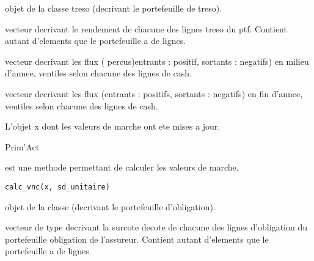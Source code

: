 \documentclass[a4paper]{book}
\begin{document}
\begin{Arguments}
\begin{ldescription}
\item[\code{x}] objet de la classe treso (decrivant le portefeuille de treso).

\item[\code{rdt}] vecteur decrivant le rendement de chacune des lignes treso du ptf.
Contient autant d'elements que le portefeuille a de lignes.

\item[\code{flux\_milieu}] vecteur decrivant les flux ( percus)entrants : positif, sortants : negatifs) en milieu d'annee, ventiles selon chacune des lignes de cash.

\item[\code{flux\_fin}] vecteur decrivant les flux (entrants : positifs, sortants : negatifs) en fin d'annee, ventiles selon chacune des lignes de cash.
\end{ldescription}
\end{Arguments}
%
\begin{Value}
L'objet x dont les valeurs de marche ont ete mises a jour.
\end{Value}
%
\begin{Author}\relax
Prim'Act
\end{Author}
%
\begin{Description}\relax
{} est une methode permettant de calculer les valeurs de marche.
\end{Description}
%
\begin{Usage}
\begin{verbatim}
calc_vnc(x, sd_unitaire)
\end{verbatim}
\end{Usage}
%
\begin{Arguments}
\begin{ldescription}
\item[\code{x}] objet de la classe  (decrivant le portefeuille d'obligation).

\item[\code{sd\_unitaire}] vecteur de type  decrivant la surcote decote de chacune des lignes d'obligation du portefeuille obligation de l'assureur.
Contient autant d'elements que le portefeuille a de lignes.
\end{ldescription}
\end{Arguments}
\end{document}
